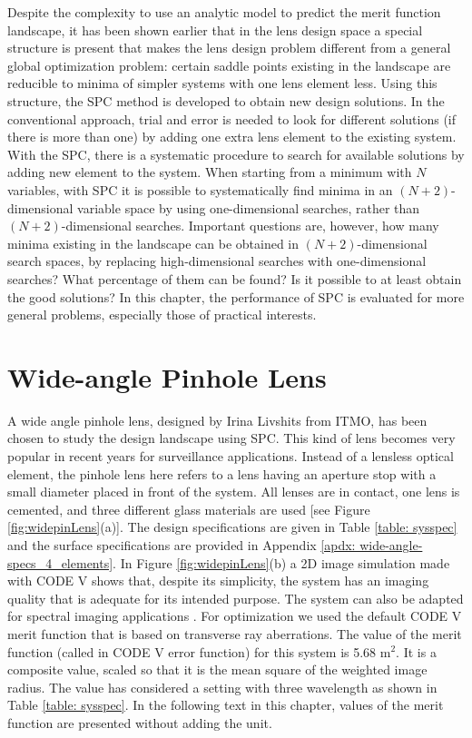 Despite the complexity to use an analytic model to predict the merit function landscape, it has been shown earlier \cite{BociortSPCSexplained}\cite{MVTurnhoutSPC15} that in the lens design space a special structure is present that makes the lens design problem different from a general global optimization problem: certain saddle points existing in the landscape are reducible to minima of simpler systems with one lens element less. Using this structure, the SPC \cite{MVTurnhoutSPC15} method is developed to obtain new design solutions. In the conventional approach, trial and error is needed to look for different solutions (if there is more than one) by adding one extra lens element to the existing system. With the SPC, there is a systematic procedure to search for available solutions by adding new element to the system. When starting from a minimum with $N$ variables, with SPC it is possible to systematically find minima in an $(N+2)$-dimensional variable space by using one-dimensional searches, rather than $(N+2)$-dimensional searches. Important questions are, however, how many minima existing in the landscape can be obtained in $(N+2)$-dimensional search spaces, by replacing high-dimensional searches with one-dimensional searches? What percentage of them can be found? Is it possible to at least obtain the good solutions? In this chapter, the performance of SPC is evaluated for more general problems, especially those of practical interests. 


\section{Wide-angle Pinhole Lens}

A wide angle pinhole lens, designed by Irina Livshits from ITMO, has been chosen to study the design landscape using SPC. This kind of lens becomes very popular in recent years for surveillance applications. Instead of a lensless optical element, the pinhole lens here refers to a lens having an aperture stop with a small diameter placed in front of the system. All lenses are in contact, one lens is cemented, and three different glass materials are used [see Figure \ref{fig:widepinLens}(a)]. The design specifications are given in Table \ref{table: sysspec} and the surface specifications are provided in Appendix \ref{apdx: wide-angle-specs_4_elements}. In Figure \ref{fig:widepinLens}(b) a 2D image simulation made with CODE V shows that, despite its simplicity, the system has an imaging quality that is adequate for its intended purpose. The system can also be adapted for spectral imaging applications \cite{Strauch2015}. For optimization we used the default CODE V merit function that is based on transverse ray aberrations. The value of the merit function (called in CODE V error function) for this system is 5.68 \textmu m$^2$. It is a composite value, scaled so that it is the mean square of the weighted image radius. The value has considered a setting with three wavelength as shown in Table \ref{table: sysspec}. In the following text in this chapter, values of the merit function are presented without adding the unit. 

